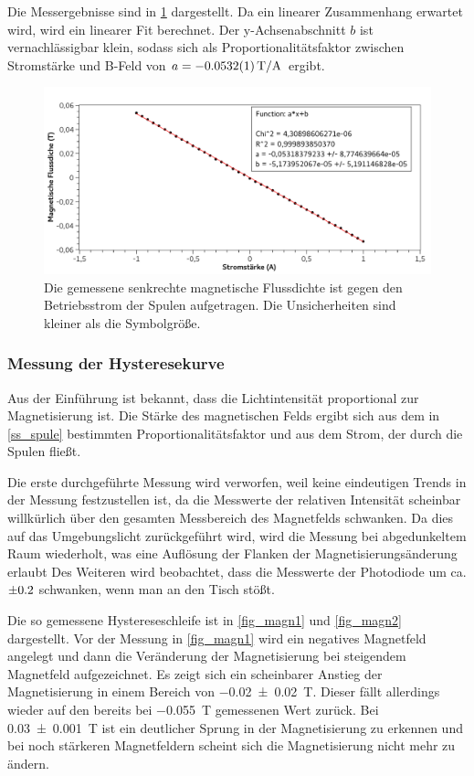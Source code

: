\documentclass[
	a4paper,
	12pt,
	pagesize,
	ngerman
]{scrartcl}
\begin{document}
	Die Messergebnisse sind in \cref{fig_spule} dargestellt. 
	Da ein linearer Zusammenhang erwartet wird, wird ein linearer Fit berechnet.
	Der y-Achsenabschnitt $b$ ist vernachlässigbar klein, sodass sich als Proportionalitätsfaktor zwischen Stromstärke und B-Feld von $a= \SI{-0,0532+-0,0001}{T/A}$ ergibt.
	\begin{figure}[H] 
		\includegraphics[width=1\textwidth]{fig_spule}
		\centering
		\caption{Die gemessene senkrechte magnetische Flussdichte ist gegen den Betriebsstrom der Spulen aufgetragen. Die Unsicherheiten sind kleiner als die Symbolgröße.} 
		\label{fig_spule}
		\centering
	\end{figure}

	\subsubsection{Messung der Hysteresekurve}
	Aus der Einführung ist bekannt, dass die Lichtintensität proportional zur Magnetisierung ist.
	Die Stärke des magnetischen Felds ergibt sich aus dem in \cref{ss_spule} bestimmten Proportionalitätsfaktor und aus dem Strom, der durch die Spulen fließt.

	Die erste durchgeführte Messung wird verworfen, weil keine eindeutigen Trends in der Messung festzustellen ist, da die Messwerte der relativen Intensität scheinbar willkürlich über den gesamten Messbereich des Magnetfelds schwanken.
	Da dies auf das Umgebungslicht zurückgeführt wird, wird die Messung bei abgedunkeltem Raum wiederholt, was eine Auflösung der Flanken der Magnetisierungsänderung erlaubt
	Des Weiteren wird beobachtet, dass die Messwerte der Photodiode um ca. $\SI{\pm0,2}{}$ schwanken, wenn man an den Tisch stößt.

	Die so gemessene Hystereseschleife ist in \cref{fig_magn1} und \cref{fig_magn2} dargestellt.
	Vor der Messung in \cref{fig_magn1} wird ein negatives Magnetfeld angelegt und dann die Veränderung der Magnetisierung bei steigendem Magnetfeld aufgezeichnet.
	Es zeigt sich ein scheinbarer Anstieg der Magnetisierung in einem Bereich von \SI{-0,02+-0,02}{T}. 
	Dieser fällt allerdings wieder auf den bereits bei \SI{-0,055}{T} gemessenen Wert zurück.
	Bei \SI{0,03+-0,001}{T} ist ein deutlicher Sprung in der Magnetisierung zu erkennen und bei noch stärkeren Magnetfeldern scheint sich die Magnetisierung nicht mehr zu ändern.
\end{document}
